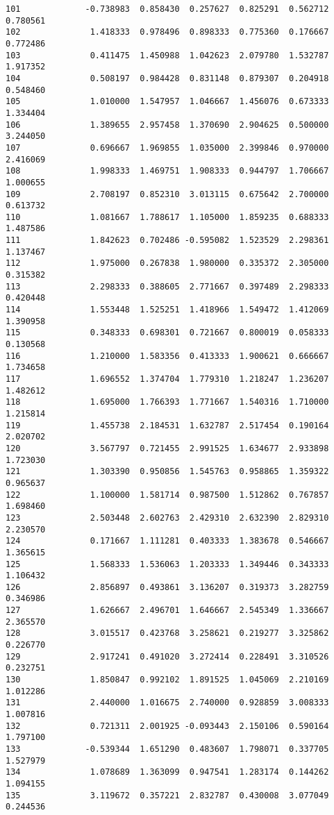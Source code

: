 \documentclass[11pt]{article}
\begin{document}
\begin{Verbatim}[commandchars=\\\{\}]
101             -0.738983  0.858430  0.257627  0.825291  0.562712  0.780561
102              1.418333  0.978496  0.898333  0.775360  0.176667  0.772486
103              0.411475  1.450988  1.042623  2.079780  1.532787  1.917352
104              0.508197  0.984428  0.831148  0.879307  0.204918  0.548460
105              1.010000  1.547957  1.046667  1.456076  0.673333  1.334404
106              1.389655  2.957458  1.370690  2.904625  0.500000  3.244050
107              0.696667  1.969855  1.035000  2.399846  0.970000  2.416069
108              1.998333  1.469751  1.908333  0.944797  1.706667  1.000655
109              2.708197  0.852310  3.013115  0.675642  2.700000  0.613732
110              1.081667  1.788617  1.105000  1.859235  0.688333  1.487586
111              1.842623  0.702486 -0.595082  1.523529  2.298361  1.137467
112              1.975000  0.267838  1.980000  0.335372  2.305000  0.315382
113              2.298333  0.388605  2.771667  0.397489  2.298333  0.420448
114              1.553448  1.525251  1.418966  1.549472  1.412069  1.390958
115              0.348333  0.698301  0.721667  0.800019  0.058333  0.130568
116              1.210000  1.583356  0.413333  1.900621  0.666667  1.734658
117              1.696552  1.374704  1.779310  1.218247  1.236207  1.482612
118              1.695000  1.766393  1.771667  1.540316  1.710000  1.215814
119              1.455738  2.184531  1.632787  2.517454  0.190164  2.020702
120              3.567797  0.721455  2.991525  1.634677  2.933898  1.723030
121              1.303390  0.950856  1.545763  0.958865  1.359322  0.965637
122              1.100000  1.581714  0.987500  1.512862  0.767857  1.698460
123              2.503448  2.602763  2.429310  2.632390  2.829310  2.230570
124              0.171667  1.111281  0.403333  1.383678  0.546667  1.365615
125              1.568333  1.536063  1.203333  1.349446  0.343333  1.106432
126              2.856897  0.493861  3.136207  0.319373  3.282759  0.346986
127              1.626667  2.496701  1.646667  2.545349  1.336667  2.365570
128              3.015517  0.423768  3.258621  0.219277  3.325862  0.226770
129              2.917241  0.491020  3.272414  0.228491  3.310526  0.232751
130              1.850847  0.992102  1.891525  1.045069  2.210169  1.012286
131              2.440000  1.016675  2.740000  0.928859  3.008333  1.007816
132              0.721311  2.001925 -0.093443  2.150106  0.590164  1.797100
133             -0.539344  1.651290  0.483607  1.798071  0.337705  1.527979
134              1.078689  1.363099  0.947541  1.283174  0.144262  1.094155
135              3.119672  0.357221  2.832787  0.430008  3.077049  0.244536

\end{Verbatim}
\end{document}
